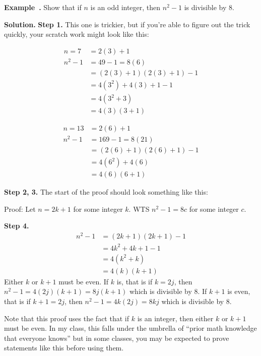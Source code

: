 \documentclass[11pt, letterpaper]{report}
\newenvironment{notes}{}{}
\newenvironment{book}{}{}
\newcounter{example}[section]
\newcommand{\example}{\refstepcounter{example}%
\par\noindent\textbf{Example~\theexample.} }
\newcommand{\btwocol}[2]{%
  \begin{minipage}[t]{0.48\linewidth} \vspace{0em} #1 \end{minipage}
  \hfill
  \begin{minipage}[t]{0.48\linewidth} \vspace{0em} #2 \end{minipage}
}
\begin{document}
\example Show that if $n$ is an odd integer, then $n^2-1$ is divisible by 8.

\begin{notes}
\vfill
\end{notes}

\begin{book}
\textbf{Solution.} \textbf{Step 1.} This one is trickier, but if you're able to figure out the trick quickly, your scratch work might look like this:
\color{blue}\btwocol{
\begin{align*}
n=7&=2(3) +1 \\
n^2-1 &= 49-1 = 8(6) \\
&= (2(3)+1)(2(3) + 1) -1 \\
&= 4(3^2) + 4(3) +1 -1 \\
&= 4(3^2 + 3) \\
&= 4(3)(3+1)
\end{align*}}{
\begin{align*}
n=13&=2(6) +1 \\
n^2-1 &= 169 -1 = 8(21) \\
&= (2(6)+1)(2(6)+1) -1 \\
&= 4(6^2) + 4(6) \\
&= 4(6)(6+1)
\end{align*}
}
\color{black}

\textbf{Step 2, 3.} The start of the proof should look something like this:

\color{blue} Proof: Let $n=2k+1$ for some integer $k$. WTS $n^2-1=8c$ for some integer $c$.
\color{black}

\textbf{Step 4.} 
\color{blue}
\begin{align*}
n^2-1 &= (2k+1)(2k+1) -1 \\
&= 4k^2+4k+1 -1 \\
&= 4(k^2+k) \\
&= 4(k)(k+1)
\end{align*}
Either $k$ or $k+1$ must be even. If $k$ is, that is if $k=2j$, then $n^2-1 = 4(2j)(k+1) = 8j(k+1)$ which is divisible by 8. If $k+1$ is even, that is if $k+1=2j$, then $n^2-1 = 4k(2j) = 8kj$ which is divisible by 8. \blacksquare
\color{black}



Note that this proof uses the fact that if $k$ is an integer, then either $k$ or $k+1$ must be even. In my class, this falls under the umbrella of ``prior math knowledge that everyone knows'' but in some classes, you may be expected to prove statements like this before using them.
\end{book}
\end{document}
